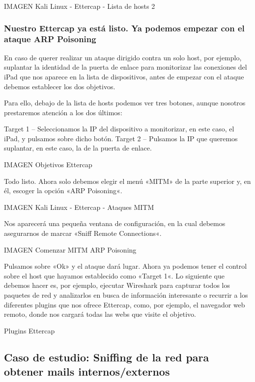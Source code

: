 IMAGEN Kali Linux - Ettercap - Lista de hosts 2

\subsubsection{Nuestro Ettercap ya está listo. Ya podemos empezar con el ataque ARP Poisoning}

En caso de querer realizar un ataque dirigido contra un solo host, por ejemplo, suplantar la identidad de la puerta de enlace para monitorizar las conexiones del iPad que nos aparece en la lista de dispositivos, antes de empezar con el ataque debemos establecer los dos objetivos.

Para ello, debajo de la lista de hosts podemos ver tres botones, aunque nosotros prestaremos atención a los dos últimos:

    Target 1 – Seleccionamos la IP del dispositivo a monitorizar, en este caso, el iPad, y pulsamos sobre dicho botón.
    Target 2 – Pulsamos la IP que queremos suplantar, en este caso, la de la puerta de enlace.

IMAGEN Objetivos Ettercap

Todo listo. Ahora solo debemos elegir el menú «MITM» de la parte superior y, en él, escoger la opción «ARP Poisoning«.

IMAGEN Kali Linux - Ettercap - Ataques MITM

Nos aparecerá una pequeña ventana de configuración, en la cual debemos asegurarnos de marcar «Sniff Remote Connections«.

IMAGEN Comenzar MITM ARP Poisoning

Pulsamos sobre «Ok» y el ataque dará lugar. Ahora ya podemos tener el control sobre el host que hayamos establecido como «Target 1«. Lo siguiente que debemos hacer es, por ejemplo, ejecutar Wireshark para capturar todos los paquetes de red y analizarlos en busca de información interesante o recurrir a los diferentes plugins que nos ofrece Ettercap, como, por ejemplo, el navegador web remoto, donde nos cargará todas las webs que visite el objetivo.

Plugins Ettercap

\subsection{Caso de estudio: Sniffing de la red para obtener mails internos/externos}

